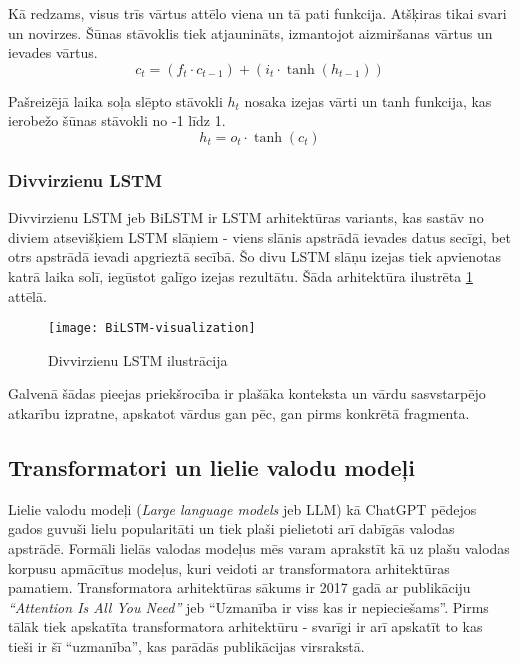Kā redzams, visus trīs vārtus attēlo viena un tā pati funkcija. Atšķiras tikai svari un novirzes. Šūnas stāvoklis tiek atjaunināts, izmantojot aizmiršanas vārtus un ievades vārtus.
\begin{equation}
c_t = (f_t \cdot c_{t-1}) + (i_t \cdot \tanh(h_{t-1}))
\end{equation}

Pašreizējā laika soļa slēpto stāvokli \(h_t\) nosaka izejas vārti un tanh funkcija, kas ierobežo šūnas stāvokli no -1 līdz 1.
\begin{equation}
h_t = o_t \cdot \tanh(c_t)
\end{equation}

\subsubsection{Divvirzienu LSTM}
Divvirzienu LSTM jeb BiLSTM ir LSTM arhitektūras variants, kas sastāv no diviem atsevišķiem LSTM slāņiem - viens slānis apstrādā ievades datus secīgi, bet otrs apstrādā ievadi apgrieztā secībā. Šo divu LSTM slāņu izejas tiek apvienotas katrā laika solī, iegūstot galīgo izejas rezultātu. Šāda arhitektūra ilustrēta \ref{fig:BiLSTM} attēlā.

\begin{figure}[H]
\texttt{[image: BiLSTM-visualization]}
\caption{Divvirzienu LSTM ilustrācija \cite{BaeldungBiLSTM}}
\label{fig:BiLSTM}
\end{figure}

Galvenā šādas pieejas priekšrocība ir plašāka konteksta un vārdu sasvstarpējo atkarību izpratne, apskatot vārdus gan pēc, gan pirms konkrētā fragmenta.

\subsection{Transformatori un lielie valodu modeļi}
Lielie valodu modeļi (\textit{Large language models} jeb LLM) kā ChatGPT pēdejos gados guvuši lielu popularitāti un tiek plaši pielietoti arī dabīgās valodas apstrādē. Formāli lielās valodas modeļus mēs varam aprakstīt kā uz plašu valodas korpusu apmācītus modeļus, kuri veidoti ar transformatora arhitektūras pamatiem. Transformatora arhitektūras sākums ir 2017 gadā ar publikāciju \textit{“Attention Is All You Need”} \cite{vaswani2023attention} jeb “Uzmanība ir viss kas ir nepieciešams”. Pirms tālāk tiek apskatīta transformatora arhitektūru - svarīgi ir arī apskatīt to kas tieši ir šī “uzmanība”, kas parādās publikācijas virsrakstā.

